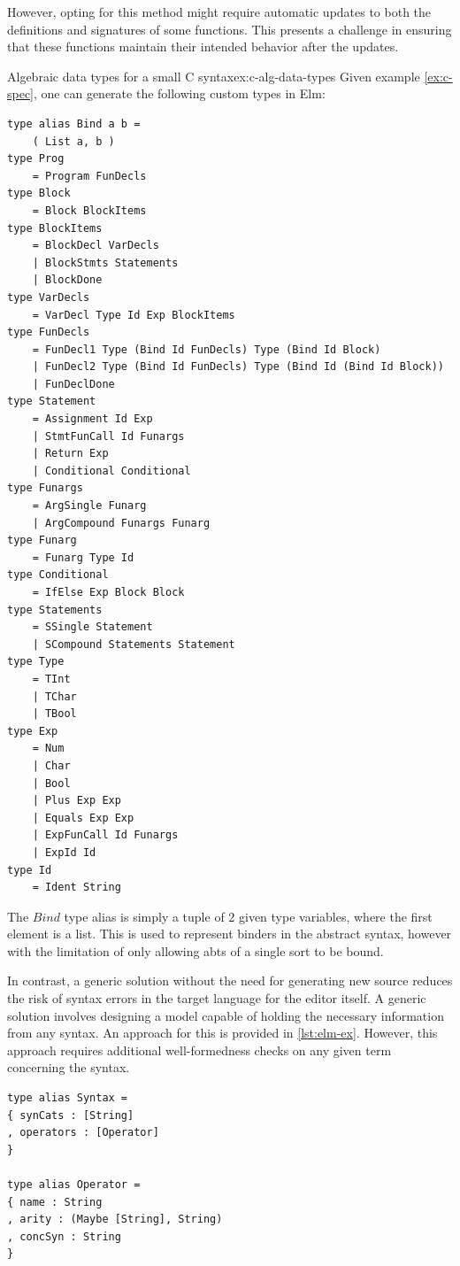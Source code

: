 However, opting for this method might require automatic updates to both the
definitions and signatures of some functions.
This presents a challenge in ensuring that these functions maintain their intended
behavior after the updates.

\begin{example}{Algebraic data types for a small C syntax}{ex:c-alg-data-types}
  Given example \cref{ex:c-spec}, one can generate the following custom types in Elm:
  \begin{lstlisting}
type alias Bind a b =
    ( List a, b )
type Prog
    = Program FunDecls
type Block
    = Block BlockItems
type BlockItems
    = BlockDecl VarDecls
    | BlockStmts Statements
    | BlockDone
type VarDecls
    = VarDecl Type Id Exp BlockItems
type FunDecls
    = FunDecl1 Type (Bind Id FunDecls) Type (Bind Id Block)
    | FunDecl2 Type (Bind Id FunDecls) Type (Bind Id (Bind Id Block))
    | FunDeclDone
type Statement
    = Assignment Id Exp
    | StmtFunCall Id Funargs
    | Return Exp
    | Conditional Conditional
type Funargs
    = ArgSingle Funarg
    | ArgCompound Funargs Funarg
type Funarg
    = Funarg Type Id
type Conditional
    = IfElse Exp Block Block
type Statements
    = SSingle Statement
    | SCompound Statements Statement
type Type
    = TInt
    | TChar
    | TBool
type Exp
    = Num
    | Char
    | Bool
    | Plus Exp Exp
    | Equals Exp Exp
    | ExpFunCall Id Funargs
    | ExpId Id
type Id
    = Ident String
\end{lstlisting}

  The $Bind$ type alias is simply a tuple of 2 given type variables,
  where the first element is a list. This is used to represent binders in the
  abstract syntax, however with the limitation of only allowing abts of a single
  sort to be bound.
\end{example}

In contrast, a generic solution without the need for generating new source reduces the risk of syntax errors in the target language for the editor itself. A generic solution involves designing a model capable of holding the necessary information from any syntax. An approach for this is provided in \cref{lst:elm-ex}. However, this approach requires additional well-formedness checks on any given term concerning the syntax.

\begin{lstlisting}[backgroundcolor=\color{myfigurecolorback},caption={Elm Records for storing syntax information},label={lst:elm-ex}]
type alias Syntax =
{ synCats : [String]
, operators : [Operator]
}

type alias Operator =
{ name : String
, arity : (Maybe [String], String)
, concSyn : String
}
\end{lstlisting}

